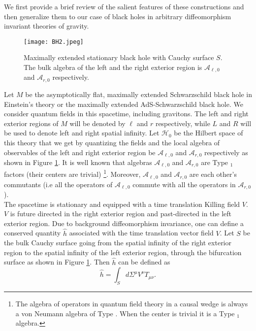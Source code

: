 \documentclass[12pt]{article}
\newcommand{\RomanNumeralCaps}[1]
    {\MakeUppercase{\romannumeral #1}}
\begin{document}
  We first provide a brief review of the salient features of these constructions and then generalize them to our case of black holes in arbitrary diffeomorphism invariant theories of gravity.


\begin{figure}[h]
  \centering
  \texttt{[image: BH2.jpeg]}
  \caption{Maximally extended stationary black hole with Cauchy surface $S$. The bulk algebra of the left and the right exterior region is $\mathcal{A}_{\ell,0}$ and $\mathcal{A}_{r,0}$ respectively.}
  \label{fig:BH2}
\end{figure}
Let $M$ be the asymptotically flat, maximally extended Schwarzschild black hole in Einstein's theory or the maximally extended AdS-Schwarzschild black hole. We consider quantum fields in this spacetime, including gravitons. The left and right exterior regions of $M$  will be denoted by $\ell$ and $r$ respectively, while $L$ and $R$ will be used to denote left and right spatial infinity. Let $\mathcal{H}_{0}$ be the Hilbert space of this theory that we get by quantizing the fields and the local algebra of observables of the left and right exterior region be $\mathcal{A}_{\ell,0}$ and $\mathcal{A}_{r,0}$ respectively as shown in Figure \ref{fig:BH2}. It is well known that algebras $\mathcal{A}_{\ell,0}$ and $\mathcal{A}_{r,0}$   are Type  \RomanNumeralCaps {3}$_1$ factors (their centers are trivial) \cite{HA, EW1,EW2}\footnote{The algebra of operators in quantum field theory in a causal wedge is always a von Neumann algebra of Type \RomanNumeralCaps {3} \cite{LL}. When the center is trivial it is a Type \RomanNumeralCaps {3}$_1$ algebra. }. Moreover, $\mathcal{A}_{\ell,0}$ and $\mathcal{A}_{r,0}$ are each other's commutants (i.e all the operators of $\mathcal{A}_{\ell,0}$ commute with all the operators in $\mathcal{A}_{r,0}$).
\\
 The spacetime is stationary and equipped with a time translation Killing field $V$. $V$ is future directed in the right exterior region and past-directed in the left exterior region. Due to background diffeomorphism invariance, one can define a conserved quantity $\hat{h}$ associated with the time translation vector field $V$. Let $S$ be the bulk Cauchy surface going from the spatial infinity of the right exterior region to the spatial infinity of the left exterior region, through the bifurcation surface as shown in Figure \ref{fig:BH2}. Then $\hat{h}$ can be defined as
 \begin{equation}\label{II1}
 \hat{h}=\int_{S}d\Sigma^{\mu}V^{\nu} T_{\mu \nu} .
 \end{equation}
\end{document}
